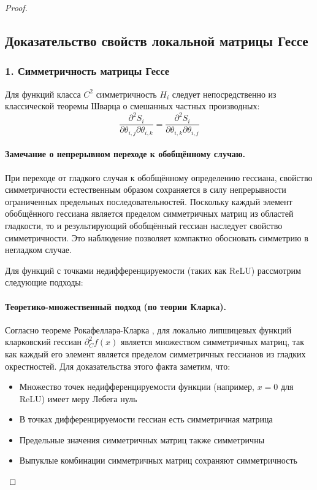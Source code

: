 \documentclass[a4paper,12pt]{article}
\begin{document}
\begin{proof}
    \subsection*{Доказательство свойств локальной матрицы Гессе}
    
    \subsubsection*{1. Симметричность матрицы Гессе}
    
    Для функций класса $C^2$ симметричность $H_i$ следует непосредственно из классической теоремы Шварца о смешанных частных производных:
    \begin{equation}
    \frac{\partial^2 S_i}{\partial \theta_{i,j} \partial \theta_{i,k}} = \frac{\partial^2 S_i}{\partial \theta_{i,k} \partial \theta_{i,j}}
    \end{equation}
    
    \paragraph{Замечание о непрерывном переходе к обобщённому случаю.}
    При переходе от гладкого случая к обобщённому определению гессиана, свойство симметричности естественным образом сохраняется в силу непрерывности ограниченных предельных последовательностей. Поскольку каждый элемент обобщённого гессиана является пределом симметричных матриц из областей гладкости, то и результирующий обобщённый гессиан наследует свойство симметричности. Это наблюдение позволяет компактно обосновать симметрию в негладком случае.
    
    Для функций с точками недифференцируемости (таких как ReLU) рассмотрим следующие подходы:
    
    \paragraph{Теоретико-множественный подход (по теории Кларка).} 
    Согласно теореме Рокафеллара-Кларка \cite{Clarke1990}, для локально липшицевых функций кларковский гессиан $\partial_C^2 f(x)$ является множеством симметричных матриц, так как каждый его элемент является пределом симметричных гессианов из гладких окрестностей. Для доказательства этого факта заметим, что:
    \begin{itemize}
    \item Множество точек недифференцируемости функции (например, $x = 0$ для ReLU) имеет меру Лебега нуль
    \item В точках дифференцируемости гессиан есть симметричная матрица
    \item Предельные значения симметричных матриц также симметричны
    \item Выпуклые комбинации симметричных матриц сохраняют симметричность
    \end{itemize}
    

\end{proof}
\end{document}
